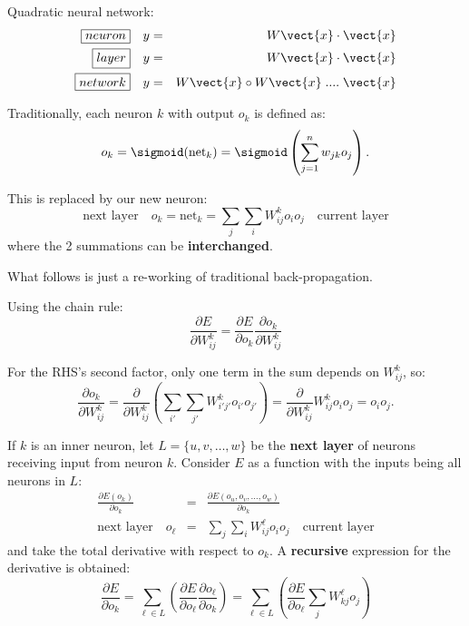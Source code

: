 Quadratic neural network:
\begin{eqnarray}
\boxed{neuron} \quad & y = & W \vect{x} \cdot \vect{x} \nonumber \\
\boxed{layer} \quad & y = & W \vect{x} \cdot \vect{x} \nonumber \\
\boxed{network} \quad & y = & W \vect{x} \circ W \vect{x} \; .... \; \vect{x} 
\end{eqnarray}

Traditionally, each neuron $k$ with output $o_k$ is defined as:
\begin{equation}
o_k = \sigmoid ({\text{net}}_k) = \sigmoid \left(\sum _{j=1}^{n} w_{jk} o_j \right) .
\end{equation}

This is replaced by our new neuron:
\begin{equation}
\boxed{\mbox{next layer}} \quad
o_k = {\text{net}}_k = \sum_j \sum_i W_{ij}^k o_i o_j
\quad \boxed{\mbox{current layer}}
\end{equation}
where the 2 summations can be \textbf{interchanged}.

What follows is just a re-working of traditional back-propagation.

Using the chain rule:
\begin{equation}
\frac{\partial E}{\partial W_{ij}^k}
= \frac{\partial E}{\partial o_k} \frac{\partial o_k}{\partial W_{ij}^k}
\end{equation}

For the RHS's second factor, only one term in the sum depends on $W_{ij}^k$, so:
\begin{equation}
	\label{eqn:do-k-dW}
\frac{\partial o_k}{\partial W_{ij}^k}
= \frac{\partial }{\partial W_{ij}^k} \left( \sum_{i'} \sum_{j'} W_{i' j'}^k o_{i'} o_{j'} \right)
= \frac{\partial }{\partial W_{ij}^k} W_{ij}^k o_i o_j = o_i o_j .
\end{equation}

If $k$ is an inner neuron, let $L = \{ u, v, \dots , w \}$ be the \textbf{next layer} of neurons receiving input from neuron $k$.  Consider $E$ as a function with the inputs being all neurons in $L$:
\begin{eqnarray}
\frac{\partial E(o_k)}{\partial o_k}
&=& \frac{\partial E(o_u, o_v, \dots, o_w)}{\partial o_k} \nonumber \\
\boxed{\mbox{next layer}} \quad
	o_{\ell} &=& \sum_j \sum_i W_{ij}^{\ell} o_i o_j
\quad \boxed{\mbox{current layer}}
\end{eqnarray}
and take the total derivative with respect to $o_k$.  A \textbf{recursive} expression for the derivative is obtained:
\begin{equation}
	\label{eqn:dE-do-k}
\frac{\partial E}{\partial o_k}
= \sum_{\ell \in L} \left( \frac{\partial E}{\partial o_{\ell}} \frac{\partial o_{\ell}}{\partial o_k} \right)
= \sum_{\ell \in L} \left( \frac{\partial E}{\partial o_{\ell}} \sum_j W_{kj}^{\ell} o_j \right)
\end{equation}

